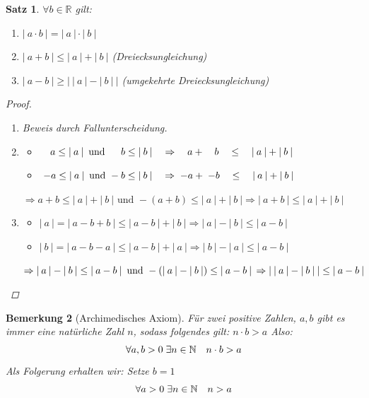 \documentclass[a4paper,titlepage,oneside]{article}
\def\N{\ensuremath{\mathbb{N}} }
\def\R{\ensuremath{\mathbb{R}} }
\def\fa{\ensuremath{\forall}}
\def\ex{\ensuremath{\exists}}
\def\sp{\hspace{0,1cm}}
\newcommand{\abs}[1]{\ensuremath{\left|\:#1\:\right|}}
\theoremstyle{thmstyle}
\theoremstyle{subthmstyle}
\newtheorem{subsatz}{Satz}[subsection]
\newtheorem{subbem}[subsatz]{Bemerkung}
\begin{document}
\begin{subsatz}
\(\fa b \in \R\) gilt:
\begin{enumerate}[label=(\arabic*)\sp\sp]
	\item \(\abs{a \cdot b} = \abs{a} \cdot \abs{b}\)
	\item \(\abs{a + b} \le \abs{a} + \abs{b}\) (Dreiecksungleichung)
	\item \(\abs{a - b} \ge \abs{\abs{a} - \abs{b}}\) (umgekehrte Dreiecksungleichung)
\end{enumerate}
\begin{proof}\sp
\begin{enumerate}[label=(\arabic*)\sp\sp]
	\item Beweis durch Fallunterscheidung.
	\item \begin{itemize}
		\item[Fall 1] \(\quad a \le \abs{a} \text{ und } \sp \quad b \le \abs{b} \quad \Rightarrow \quad a + \quad b \quad\le\quad \abs{a}+\abs{b} \)
		\item[Fall 2] \(\sp-a \le \abs{a} \text{ und } -b \le \abs{b} \quad \Rightarrow \sp -a + \sp -b \quad\le\quad \abs{a} +\abs{b} \)
		\end{itemize}
		\(\Rightarrow a + b \le \abs{a} + \abs{b} \text{ und } -(a + b) \le \abs{a} + \abs{b} \Rightarrow \abs{a + b} \le \abs{a} + \abs{b} \)
	\item \begin{itemize}
		\item[1.] \(\abs{a} = \abs{a - b + b} \le \abs{a - b} + \abs{b} \Rightarrow \abs{a} - \abs{b} \le \abs{a-b}\)
		\item[2.] \(\abs{b} = \abs{a - b - a} \le \abs{a - b} + \abs{a} \Rightarrow \abs{b} - \abs{a} \le \abs{a-b}\)
		\end{itemize}
		\(\Rightarrow \abs{a} - \abs{b} \le \abs{a-b} \text{ und } - (\abs{a} - \abs{b}) \le \abs{a-b} \\
	\Rightarrow \abs{\abs{a} - \abs{b}} \le \abs{a-b}\)
\end{enumerate}
\end{proof}
\end{subsatz}

\begin{subbem}[Archimedisches Axiom]
Für zwei positive Zahlen, \(a, b\) gibt es immer eine natürliche Zahl $n$, sodass folgendes gilt: \(n \cdot b > a\) Also:
\[\fa a,b > 0 \sp \ex n \in \N \quad n \cdot b > a\]
Als Folgerung erhalten wir: Setze \(b = 1\)
\[\fa a > 0 \sp \ex n \in \N \quad n > a\]
\end{subbem}
\end{document}
